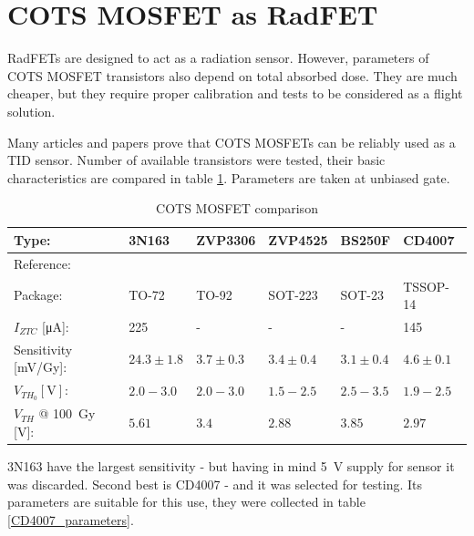 \section{COTS MOSFET as RadFET}
    RadFETs are designed to act as a radiation sensor. However, parameters of COTS MOSFET transistors also depend on total absorbed dose. They are much cheaper, but they require proper calibration and tests to be considered as a flight solution.

    Many articles and papers prove that COTS MOSFETs can be reliably used as a TID sensor. Number of available transistors were tested, their basic characteristics are compared in table \ref{cots_mosfet_comparison}. Parameters are taken at unbiased gate.

    \begin{table}[H]
    \begin{tabular}{| L{2cm} | C{2.4cm} | C{2.4cm} | C{2.4cm} | C{2.4cm} | C{2.4cm} |}
        \hline
        Type: & 3N163 & ZVP3306 & ZVP4525 & BS250F & CD4007 \\ \hline
        Reference: & \cite{3N163_article} & \cite{COTSMosfetsGarcia} & \cite{COTSMosfetsGarcia} & \cite{COTSMosfetsGarcia} & \cite{COTSMosfetsGarcia} \\ \hline

        Package: & TO-72 & TO-92 & SOT-223 & SOT-23 & TSSOP-14 \\ \hline

        $I_{ZTC}$ [\si{\micro\ampere}]: & 225 & - & - & - & 145 \\ \hline

        Sensitivity [\si{\milli\volt/\gray}]: & $24.3\pm 1.8$ & $3.7\pm 0.3$ & $3.4\pm 0.4$ & $3.1\pm 0.4$ & $4.6\pm 0.1$ \\ \hline

        $V_{TH_0} [\si{\volt}]$: & $2.0 - 3.0$ & $2.0 - 3.0$ & $1.5 - 2.5$ & $2.5 - 3.5$ & $1.9 - 2.5$ \\ \hline

        $V_{TH}$ @ \SI{100}{\gray} [\si{\volt}]: & $5.61$ & $3.4$ & $2.88$ & $3.85$ & $2.97$ \\ \hline
    \end{tabular}
    \caption{COTS MOSFET comparison}
    \label{cots_mosfet_comparison}
    \end{table}

    3N163 have the largest sensitivity - but having in mind \SI{5}{\volt} supply for sensor it was discarded. Second best is CD4007 - and it was selected for testing. Its parameters are suitable for this use, they were collected in table \ref{CD4007_parameters}.

